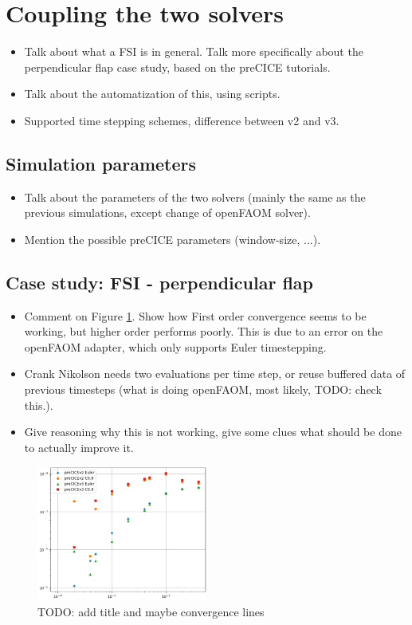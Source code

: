 \documentclass[
  english,        %
  font=times,     %
  onecolumn,      %
]{tumarticle}
\begin{document}
\section{Coupling the two solvers}
\begin{itemize}
    \item Talk about what a FSI is in general. Talk more specifically about the perpendicular flap case study, based on the preCICE tutorials.
    \item Talk about the automatization of this, using scripts.
    \item Supported time stepping schemes, difference between v2 and v3.
\end{itemize}
\subsection{Simulation parameters}
    \begin{itemize}
    \item Talk about the parameters of the two solvers (mainly the same as the previous simulations, except change of openFAOM solver). 
    \item Mention the possible preCICE parameters (window-size, ...).
    \end{itemize} 

\subsection{Case study: FSI - perpendicular flap}
\begin{itemize}
    \item Comment on Figure \ref{fig:coupled_v2_v3}. Show how First order convergence seems to be working, but higher order performs poorly. This is due to an error on the openFAOM adapter, which only supports Euler timestepping.
    \item Crank Nikolson needs two evaluations per time step, or reuse buffered data of previous timesteps (what is doing openFAOM, most likely, TODO: check this.).
    \item Give reasoning why this is not working, give some clues what should be done to actually improve it.
\end{itemize}


\begin{figure}[!ht]
    \centering
    \includegraphics[width=0.5\textwidth]{resources/coupled_v2_v3_results.png}
    \caption{TODO: add title and maybe convergence lines}
    \label{fig:coupled_v2_v3}
\end{figure}
\end{document}
